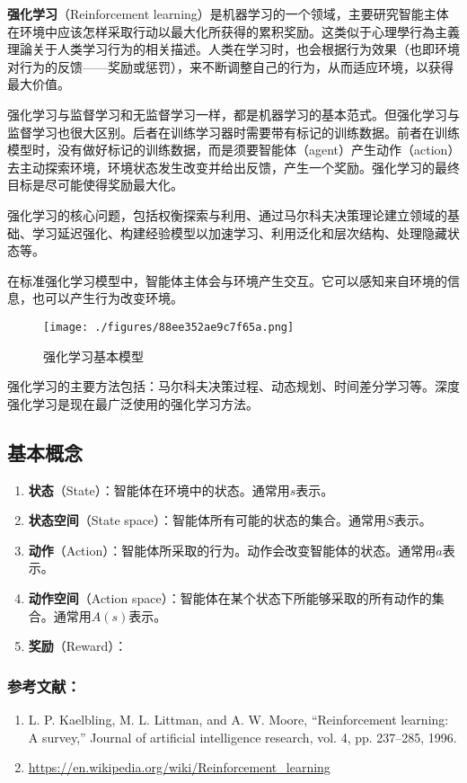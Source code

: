
\textbf{强化学习}（Reinforcement learning）是机器学习的一个领域，主要研究智能主体在环境中应该怎样采取行动以最大化所获得的累积奖励。这类似于心理學行為主義理論关于人类学习行为的相关描述。人类在学习时，也会根据行为效果（也即环境对行为的反馈——奖励或惩罚），来不断调整自己的行为，从而适应环境，以获得最大价值。

强化学习与监督学习和无监督学习一样，都是机器学习的基本范式。但强化学习与监督学习也很大区别。后者在训练学习器时需要带有标记的训练数据。前者在训练模型时，没有做好标记的训练数据，而是须要智能体（agent）产生动作（action）去主动探索环境，环境状态发生改变并给出反馈，产生一个奖励。强化学习的最终目标是尽可能使得奖励最大化。

强化学习的核心问题，包括权衡探索与利用、通过马尔科夫决策理论建立领域的基础、学习延迟强化、构建经验模型以加速学习、利用泛化和层次结构、处理隐藏状态等。

在标准强化学习模型中，智能体主体会与环境产生交互。它可以感知来自环境的信息，也可以产生行为改变环境。

\begin{figure}[ht]
\centering
\texttt{[image: ./figures/88ee352ae9c7f65a.png]}
\caption{强化学习基本模型} \label{fig_rl_1}
\end{figure}

强化学习的主要方法包括：马尔科夫决策过程、动态规划、时间差分学习等。深度强化学习是现在最广泛使用的强化学习方法。

\subsection{基本概念}

\begin{enumerate}
\item \textbf{状态}（State）：智能体在环境中的状态。通常用$s$表示。
\item \textbf{状态空间}（State space）：智能体所有可能的状态的集合。通常用$S$表示。
\item \textbf{动作}（Action）：智能体所采取的行为。动作会改变智能体的状态。通常用$a$表示。
\item \textbf{动作空间}（Action space）：智能体在某个状态下所能够采取的所有动作的集合。通常用$A(s)$表示。
\item \textbf{奖励}（Reward）：
\end{enumerate}



\subsubsection{参考文献：}
\begin{enumerate}
\item L. P. Kaelbling, M. L. Littman, and A. W. Moore, “Reinforcement learning: A survey,” Journal of artificial intelligence research, vol. 4, pp. 237–285, 1996.
\item \href{https://en.wikipedia.org/wiki/Reinforcement\%5C_learning}{https://en.wikipedia.org/wiki/Reinforcement\_learning}
\end{enumerate}
